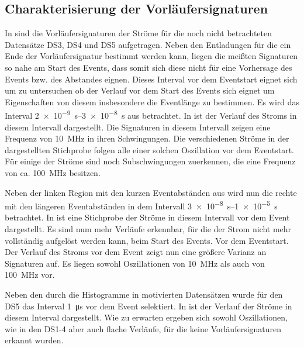 \subsection{Charakterisierung der Vorläufersignaturen}
In  sind die Vorläufersignaturen der Ströme für die noch nicht betrachteten Datensätze DS3, DS4 und DS5 aufgetragen.
Neben den Entladungen für die ein Ende der Vorläufersignatur bestimmt werden kann, liegen die meißten Signaturen so nahe am Start des Events, dass somit sich diese nicht für eine Vorhersage des Events bzw. des Abstandes eignen. Dieses Interval vor dem Eventstart eignet sich um zu untersuchen ob der Verlauf vor dem Start des Events sich eignet um Eigenschaften von diesem insbesondere die Eventlänge zu bestimmen. Es wird das Interval \SIrange{2e-9}{3e-8}{\second} aus  betrachtet. In  ist der Verlauf des Stroms in diesem Intervall dargestellt. Die Signaturen in diesem Intervall zeigen eine Frequenz von \SI{10}{\mega\hertz} in ihren Schwingungen. Die verschiedenen Ströme in der dargestellten Stichprobe folgen alle einer solchen Oszillation vor dem Eventstart. Für einige der Ströme sind noch Subschwingungen zuerkennen, die eine Frequenz von ca. \SI{100}{\mega\hertz} besitzen.  

Neben der linken Region mit den kurzen Eventabständen aus  wird nun die rechte mit den längeren Eventabständen in dem Intervall \SIrange{3e-8}{1e-5}{\second} betrachtet. In  ist eine Stichprobe der Ströme in diesem Intervall vor dem Event dargestellt. Es sind num mehr Verläufe erkennbar, für die der Strom nicht mehr vollständig aufgelöst werden kann, beim Start des Events. Vor dem Eventstart. Der Verlauf des Stroms vor dem Event zeigt nun eine größere Varianz an Signaturen auf. Es liegen sowohl Oszillationen von \SI{10}{\mega\hertz} als auch von \SI{100}{\mega\hertz} vor. 

Neben den durch die Histogramme in  motivierten Datensätzen wurde für den DS5 das Interval \SI{1}{\micro\second} vor dem Event selektiert. In  ist der Verlauf der Ströme in diesem Interval dargestellt. Wie zu erwarten ergeben sich sowohl Oszillationen, wie in den DS1-4 aber auch flache Verläufe, für die keine Vorläufersignaturen erkannt wurden. 


